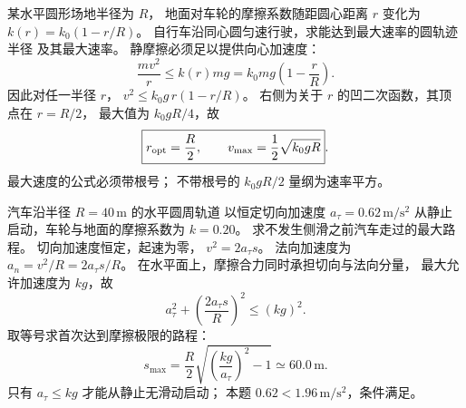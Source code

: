 某水平圆形场地半径为 $R$，
地面对车轮的摩擦系数随距圆心距离 $r$ 变化为
$k(r)=k_0(1-r/R)$。
自行车沿同心圆匀速行驶，求能达到最大速率的圆轨迹半径
及其最大速率。
\exsolution
静摩擦必须足以提供向心加速度：
\[
\frac{mv^2}{r}\le k(r)mg
=k_0mg\left(1-\frac rR\right).
\]
因此对任一半径 $r$，
$v^2\le k_0g\,r(1-r/R)$。
右侧为关于 $r$ 的凹二次函数，其顶点在 $r=R/2$，
最大值为 $k_0gR/4$，故
\[
\boxed{r_{\rm opt}=\frac R2,\qquad
v_{\max}=\frac12\sqrt{k_0gR}}.
\]
\excheck 最大速度的公式必须带根号；
不带根号的 $k_0gR/2$ 量纲为速率平方。

汽车沿半径 $R=40\,\mathrm m$ 的水平圆周轨道
以恒定切向加速度 $a_\tau=0.62\,\mathrm{m/s^2}$
从静止启动，车轮与地面的摩擦系数为 $k=0.20$。
求不发生侧滑之前汽车走过的最大路程。
\exsolution
切向加速度恒定，起速为零，
$v^2=2a_\tau s$。
法向加速度为 $a_n=v^2/R=2a_\tau s/R$。
在水平面上，摩擦合力同时承担切向与法向分量，
最大允许加速度为 $kg$，故
\[
a_\tau^2+\left(\frac{2a_\tau s}{R}\right)^2\le (kg)^2.
\]
取等号求首次达到摩擦极限的路程：
\[
\boxed{s_{\max}=\frac R2
\sqrt{\left(\frac{kg}{a_\tau}\right)^2-1}
\simeq60.0\,\mathrm m}.
\]
\excheck 只有 $a_\tau\le kg$ 才能从静止无滑动启动；
本题 $0.62<1.96\,\mathrm{m/s^2}$，条件满足。
